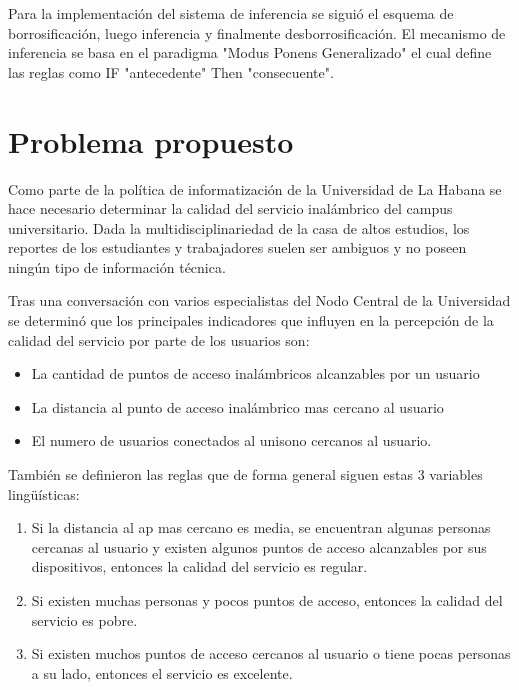 \documentclass[a4paper,10pt,twocolumn]{article}
\begin{document}
	Para la implementación del sistema de inferencia se siguió el esquema de borrosificación, luego inferencia y finalmente desborrosificación. El mecanismo de inferencia se basa en el paradigma "Modus Ponens Generalizado" el cual define las reglas como IF "antecedente" Then "consecuente". 




\section{Problema propuesto}\label{sec:dev}
	Como parte de la política de informatización de la Universidad de La Habana se hace necesario determinar la calidad del servicio inalámbrico del campus universitario. Dada la multidisciplinariedad de la casa de altos estudios, los reportes de los estudiantes y trabajadores suelen ser ambiguos y no poseen ningún tipo de información técnica.
	
	Tras una conversación con varios especialistas del Nodo Central de la Universidad se determinó que los principales indicadores que influyen en la percepción de la calidad del servicio por parte de los usuarios son:
	
	\begin{itemize}
		\item La cantidad de puntos de acceso inalámbricos alcanzables por un usuario
		\item La distancia al punto de acceso inalámbrico mas cercano al usuario
		\item El numero de usuarios conectados al unisono cercanos al usuario.
	\end{itemize}

	También se definieron las reglas que de forma general siguen estas 3 variables lingüísticas:
	
	\begin{enumerate}
		\item Si la distancia al ap mas cercano es media, se encuentran algunas personas cercanas al usuario y existen algunos puntos de acceso alcanzables por sus dispositivos, entonces la calidad del servicio es regular.
		\item Si existen muchas personas y pocos puntos de acceso, entonces la calidad del servicio es pobre.
		\item Si existen muchos puntos de acceso cercanos al usuario o tiene pocas personas a su lado, entonces el servicio es excelente.
	\end{enumerate}	


\label{end}
\end{document}
